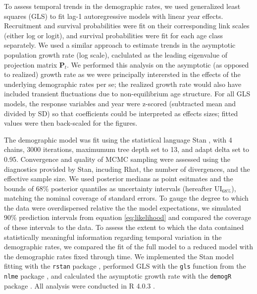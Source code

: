 To assess temporal trends in the demographic rates, 
we used generalized least squares  (GLS) to fit lag-1 autoregressive models
with linear year effects.
Recruitment and survival probabilities were fit on their corresponding link scales 
(either log or logit),
and survival probabilities were fit for each age class separately.
We used a similar approach to estimate trends in the asymptotic population growth rate
(log scale), 
caclulated as the leading eigenvalue of projection matrix $\mathbf{P}_{t}$.
We performed this analysis on the asymptotic (as opposed to realized) growth rate 
as we were principally interersted in the effects 
of the underlying demographic rates per se; 
the realized growth rate would also have included transient fluctuations due to
non-equilibrium age structure.
For all GLS models, the response variables and year were z-scored 
(subtracted mean and divided by SD) so that coefficients
could be interpreted as effects sizes;
fitted values were then back-scaled for the figures.

The demographic model was fit using the statistical language Stan \citep{carpenter2017stan},
with 4 chains, 3000 iterations, maximumum tree depth set to 13, and adapt delta set to 0.95.
Convergence and quality of MCMC sampling were assessed using the diagnostics provided by Stan, 
incuding Rhat, the number of divergences, and the effective sample size.
We used posterior medians as point esitmates 
and the bounds of 68\% posterior quantiles as uncertainty intervals 
(hereafter $\text{UI}_{68\%}$), 
matching the nominal coverage of standard errors.
To gauge the degree to which the data were overdispersed relative 
the the model expectations, 
we simulated 90\% prediction intervals from equation \ref{eq:likelihood} 
and compared the coverage of these intervals to the data.
To assess the extent to which the data contained statistically meaningful information 
regarding temporal variation in the demographic rates,
we compared the fit of the full model to a reduced model with the demographic
rates fixed through time.
We implemented the Stan model fitting with the \texttt{rstan} package \citep{stan2020rstan},
performed GLS with the \texttt{gls} function from the \texttt{nlme} package \citep{pinheiro2020nlme}, 
and calculated the asymptotic growth rate with the \texttt{demogR} package \citep{holland2007demogR}.
All analysis were conducted in R 4.0.3 \citep{r2020}. 

